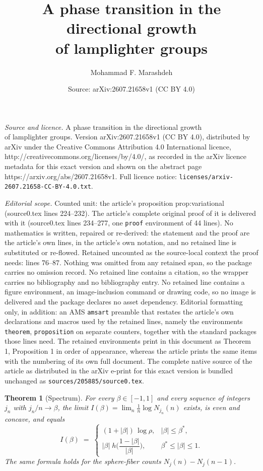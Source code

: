 \documentclass[10pt,a4paper]{amsart}
\title{A phase transition in the directional growth\\ of lamplighter groups}
\author{Mohammad F. Marashdeh}
\date{Source: arXiv:2607.21658v1 (CC BY 4.0)}
\newtheorem{theorem}{Theorem}
\begin{document}
\maketitle

\noindent\emph{Source and licence.} A phase transition in the directional growth\\ of lamplighter groups. Version arXiv:2607.21658v1 (CC BY 4.0), distributed by arXiv under the Creative Commons Attribution 4.0 International licence, http://creativecommons.org/licenses/by/4.0/, as recorded in the arXiv licence metadata for this exact version and shown on the abstract page https://arxiv.org/abs/2607.21658v1. Full licence notice: \texttt{licenses/arxiv-2607.21658-CC-BY-4.0.txt}.\par\smallskip

\noindent\textit{Editorial scope.} Counted unit: the article's proposition prop:variational (source0.tex lines 224--232). The article's complete original proof of it is delivered with it (source0.tex lines 234--277, one \texttt{proof} environment of 44 lines). No mathematics is written, repaired or re-derived: the statement and the proof are the article's own lines, in the article's own notation, and no retained line is substituted or re-flowed.  Retained uncounted as the source-local context the proof needs: lines 76--87.  Nothing was omitted from any retained span, so the package carries no omission record.  No retained line contains a citation, so the wrapper carries no bibliography and no bibliography entry.  No retained line contains a figure environment, an image-inclusion command or drawing code, so no image is delivered and the package declares no asset dependency.  Editorial formatting only, in addition: an AMS \texttt{amsart} preamble that restates the article's own declarations and macros used by the retained lines, namely the environments \texttt{theorem}, \texttt{proposition} on separate counters, together with the standard packages those lines need.  The retained environments print in this document as Theorem 1, Proposition 1 in order of appearance, whereas the article prints the same items with the numbering of its own full document.  The complete native source of the article as distributed in the arXiv e-print for this exact version is bundled unchanged as \texttt{sources/205885/source0.tex}.
\begin{theorem}[Spectrum]\label{thm:spectrum}
For every $\beta\in[-1,1]$ and every sequence of integers $j_n$ with $j_n/n\to\beta$, the limit
$I(\beta)=\lim_n\frac1n\log N_{j_n}(n)$ exists, is even and concave, and equals
\[
I(\beta)\;=\;
\begin{cases}
(1+|\beta|)\,\log\rho, & |\beta|\le\beta^{*},\\[2pt]
|\beta|\;h\!\Big(\dfrac{1-|\beta|}{|\beta|}\Big), & \beta^{*}\le|\beta|\le1 .
\end{cases}
\]
The same formula holds for the sphere-fiber counts $N_j(n)-N_j(n-1)$.
\end{theorem}
\end{document}
